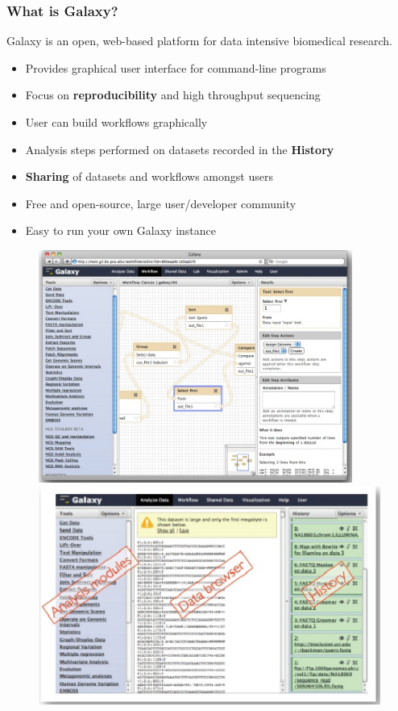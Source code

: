 \documentclass{beamer}              %
\begin{document}
\begin{frame}
    \frametitle{What is Galaxy?}
	Galaxy is an open, web-based platform for data intensive biomedical research.
	\begin{itemize}
		\item Provides graphical user interface for command-line programs
		\item Focus on \textbf{reproducibility} and high throughput sequencing
		\item User can build workflows graphically
		\item Analysis steps performed on datasets recorded in the \textbf{History}
		\item \textbf{Sharing} of datasets and workflows amongst users
		\item Free and open-source, large user/developer community
		\item Easy to run your own Galaxy instance
	\end{itemize}
	\begin{figure}
		\includegraphics[height=0.25\textheight]{figures/101p_01a.png} \qquad\qquad
		\includegraphics[height=0.25\textheight]{figures/101p_01b.png}
	\end{figure}
\end{frame}
\end{document}
